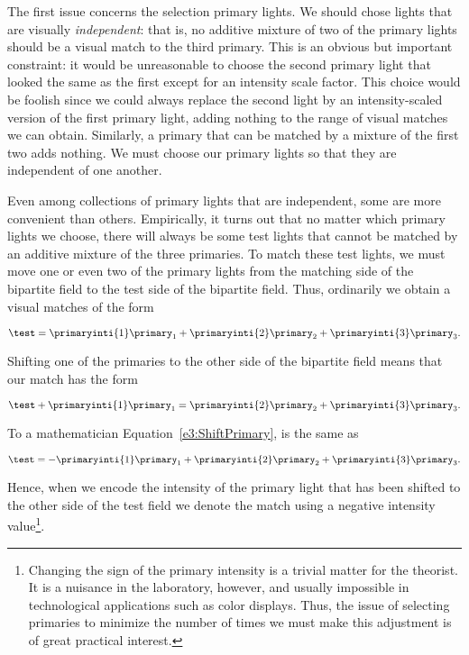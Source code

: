 The first issue concerns
the selection primary lights.
We should chose lights that are visually {\em independent}:
that is,
no additive mixture of two of the primary lights should 
be a visual match to the third primary.
This is an obvious but important constraint:
it would be unreasonable to choose the second
primary light that looked the same
as the first except for an intensity scale factor.
This choice would be foolish since
we could always replace the second light by
an intensity-scaled version of the first primary light,
adding nothing to
the range of visual matches we can obtain.
Similarly, a primary that can be matched by a mixture
of the first two adds nothing.
We must choose our primary lights so that they are
independent of one another.

Even among collections of primary lights that are independent,
some are more convenient than others.
Empirically, it turns out that no matter which primary
lights we choose, there will always be some test lights
that cannot be matched by an additive mixture of the three
primaries.
To match these test lights,
we must move one or even two
of the primary lights from the matching side of
the bipartite field to the test side of the bipartite field.
Thus, ordinarily we obtain a visual matches of the form

\begin{equation}
\test = 
 \primaryinti{1} \primary_{1} + 
 \primaryinti{2} \primary_{2} + 
 \primaryinti{3} \primary_3 .
\end{equation}

Shifting one of the primaries to the other side of the bipartite
field means that our match has the form

\begin{equation}
\label{e3:ShiftPrimary}
\test + \primaryinti{1} \primary_{1} = 
   \primaryinti{2} \primary_{2} + \primaryinti{3} \primary_3 .
\end{equation}

To a mathematician Equation~\ref{e3:ShiftPrimary},
is the same as

\begin{equation}
\label{e3:NegativePrimary}
\test = 
   - \primaryinti{1} \primary_1 +
     \primaryinti{2} \primary_2 + 
     \primaryinti{3} \primary_3 .
\end{equation}

Hence, when we encode the intensity of the primary light that
has been shifted to the other side of the test field we denote
the match using a negative intensity value\footnote{
Changing the sign of the primary intensity
is a trivial matter for the theorist.
It is a nuisance in the laboratory, however,
and usually impossible in technological applications such
as color displays.
Thus, the issue of selecting primaries to minimize
the number of times we must make this adjustment is
of great practical interest.}.

